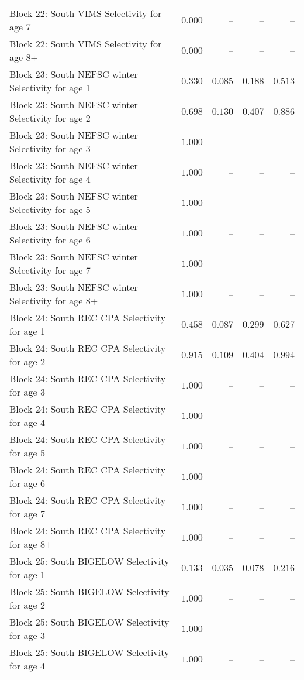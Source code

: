 \documentclass[
]{article}
\begin{document}
\begin{landscape}
\begin{longtable}[t]{lrrrr}
Block 22: South VIMS Selectivity for age 7 & $0.000$ & -- & -- & --\\
Block 22: South VIMS Selectivity for age 8+ & $0.000$ & -- & -- & --\\
Block 23: South NEFSC winter Selectivity for age 1 & $0.330$ & $0.085$ & $0.188$ & $0.513$\\
\addlinespace
Block 23: South NEFSC winter Selectivity for age 2 & $0.698$ & $0.130$ & $0.407$ & $0.886$\\
Block 23: South NEFSC winter Selectivity for age 3 & $1.000$ & -- & -- & --\\
Block 23: South NEFSC winter Selectivity for age 4 & $1.000$ & -- & -- & --\\
Block 23: South NEFSC winter Selectivity for age 5 & $1.000$ & -- & -- & --\\
Block 23: South NEFSC winter Selectivity for age 6 & $1.000$ & -- & -- & --\\
\addlinespace
Block 23: South NEFSC winter Selectivity for age 7 & $1.000$ & -- & -- & --\\
Block 23: South NEFSC winter Selectivity for age 8+ & $1.000$ & -- & -- & --\\
Block 24: South REC CPA Selectivity for age 1 & $0.458$ & $0.087$ & $0.299$ & $0.627$\\
Block 24: South REC CPA Selectivity for age 2 & $0.915$ & $0.109$ & $0.404$ & $0.994$\\
Block 24: South REC CPA Selectivity for age 3 & $1.000$ & -- & -- & --\\
\addlinespace
Block 24: South REC CPA Selectivity for age 4 & $1.000$ & -- & -- & --\\
Block 24: South REC CPA Selectivity for age 5 & $1.000$ & -- & -- & --\\
Block 24: South REC CPA Selectivity for age 6 & $1.000$ & -- & -- & --\\
Block 24: South REC CPA Selectivity for age 7 & $1.000$ & -- & -- & --\\
Block 24: South REC CPA Selectivity for age 8+ & $1.000$ & -- & -- & --\\
\addlinespace
Block 25: South BIGELOW Selectivity for age 1 & $0.133$ & $0.035$ & $0.078$ & $0.216$\\
Block 25: South BIGELOW Selectivity for age 2 & $1.000$ & -- & -- & --\\
Block 25: South BIGELOW Selectivity for age 3 & $1.000$ & -- & -- & --\\
Block 25: South BIGELOW Selectivity for age 4 & $1.000$ & -- & -- & --\\

\end{longtable}
\end{landscape}
\end{document}

